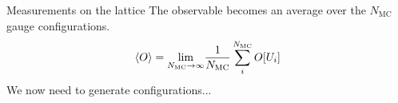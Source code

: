 \documentclass[10pt,show notes on second screen]{beamer}
\begin{document}
\begin{frame}{Measurements on the lattice}
The observable becomes an average over the $N_\mathrm{MC}$ gauge configurations.
\begin{align*}
    \left\langle{O}\right\rangle = \underset{N_\mathrm{MC}\rightarrow\infty}{\lim} \frac{1}{N_\mathrm{MC}} \sum^{N_\mathrm{MC}}_i O[U_i]
\end{align*}
We now need to generate configurations...
\end{frame}

\end{document}
